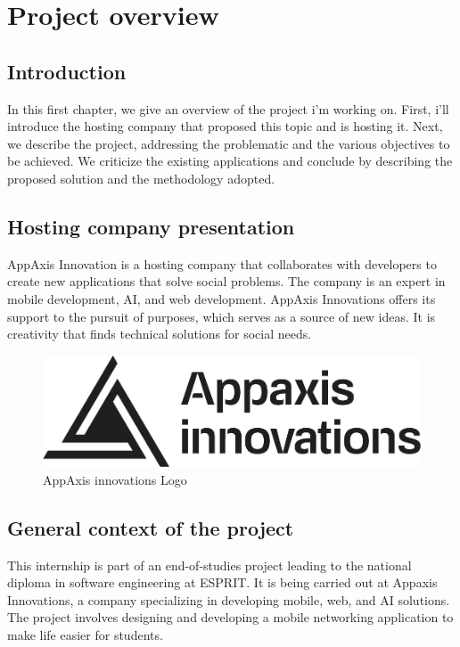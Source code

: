 \chapter{Project overview}


\section*{Introduction}
In this first chapter, we give an overview of the project i'm working on. First, i'll introduce the hosting company that proposed this topic and is hosting it. Next, we describe the project, addressing the problematic and the various objectives to be achieved. We criticize the existing applications and conclude by describing the proposed solution and the methodology adopted.


\section{Hosting company presentation}
AppAxis Innovation is a hosting company that collaborates with developers to create new applications that solve social problems. The company is an expert in mobile development, AI, and web development. AppAxis Innovations offers its support to the pursuit of purposes, which serves as a source of new ideas. It is creativity that finds technical solutions for social needs.
\begin{figure}[H] 
            \centering
            \includegraphics[scale=0.3]{logos/Full Logo Horizontal Stacked Black PNG.png}
            \caption{AppAxis innovations Logo} 
            \label{fig:Appaxis Logo}
\end{figure}

\section{General context of the project}
This internship is part of an end-of-studies project leading to the national diploma in software engineering at ESPRIT. It is being carried out at Appaxis Innovations, a company specializing in developing mobile, web, and AI solutions. The project involves designing and developing a mobile networking application to make life easier for students.

